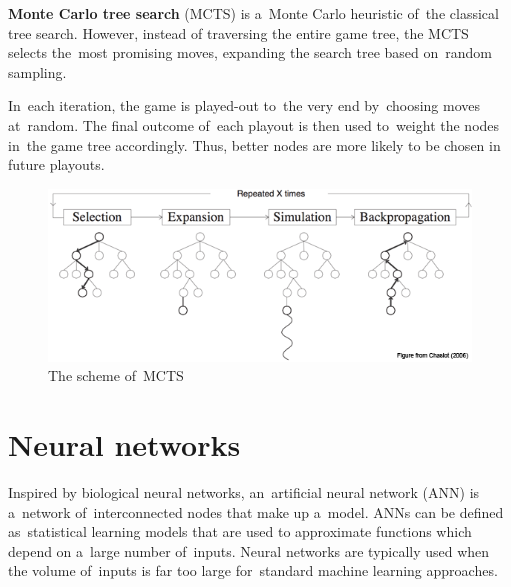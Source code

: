 \textbf{Monte Carlo tree search} (MCTS) is a~Monte Carlo heuristic of~the classical tree search.
However, instead of traversing the entire game tree, the MCTS selects the~most promising moves, expanding the search tree based on~random sampling.

In~each iteration, the game is played-out to~the very end by~choosing moves at~random.
The final outcome of~each playout is then used to~weight the nodes in~the game tree accordingly.
Thus, better nodes are more likely to be chosen in future playouts.

\begin{figure}[H]
  \centering
  \includegraphics[width=.6\textwidth]{../img/MCTS.png}
  \caption{The scheme of~MCTS}
  \label{fig:MCTS}
\end{figure}

\section{Neural networks}

Inspired by biological neural networks, an~artificial neural network (ANN) is a~network of~interconnected nodes that make up a~model.
ANNs can be defined as~statistical learning models that are used to approximate functions which depend on a~large number of~inputs.
Neural networks are typically used when the volume of~inputs is far too large for~standard machine learning approaches.

